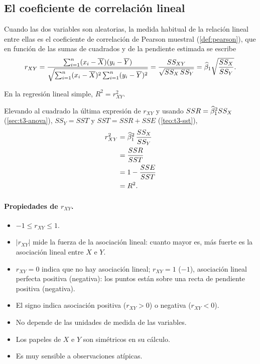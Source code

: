 \subsection{El coeficiente de correlación lineal}

Cuando las dos variables son aleatorias, la medida habitual de la relación lineal entre ellas es
el coeficiente de correlación de Pearson muestral (\cref{def:pearson}), que en función de las
sumas de cuadrados y de la pendiente estimada se escribe
\[
  r_{XY} = \frac{\sum_{i=1}^{n} (x_i-\overline{X})(y_i-\overline{Y})}
                {\sqrt{\sum_{i=1}^{n} (x_i-\overline{X})^2\sum_{i=1}^{n} (y_i-\overline{Y})^2}}
  = \frac{SS_{XY}}{\sqrt{SS_X\,SS_Y}} = \widehat{\beta}_1\sqrt{\frac{SS_X}{SS_Y}} .
\]

\begin{proposicion}
  En la regresión lineal simple, $R^2=r_{XY}^2$.
\end{proposicion}

\begin{demostracion}
  Elevando al cuadrado la última expresión de $r_{XY}$ y usando $SSR=\widehat{\beta}_1^2SS_X$
  (\cref{sec:t3-anova}), $SS_Y=SST$ y $SST=SSR+SSE$ (\cref{teo:t3-sst}),
  \begin{align*}
    r_{XY}^2 &= \widehat{\beta}_1^2\,\frac{SS_X}{SS_Y} \\
    &= \frac{SSR}{SST} \\
    &= 1-\frac{SSE}{SST} \\
    &= R^2 .
  \end{align*}
\end{demostracion}

\paragraph{Propiedades de $r_{XY}$.}
\begin{itemize}
  \item $-1\le r_{XY}\le1$.
  \item $|r_{XY}|$ mide la fuerza de la asociación lineal: cuanto mayor es, más fuerte es la
    asociación lineal entre $X$ e $Y$.
  \item $r_{XY}=0$ indica que no hay asociación lineal; $r_{XY}=1$ ($-1$), asociación lineal
    perfecta positiva (negativa): los puntos están sobre una recta de pendiente positiva
    (negativa).
  \item El signo indica asociación positiva ($r_{XY}>0$) o negativa ($r_{XY}<0$).
  \item No depende de las unidades de medida de las variables.
  \item Los papeles de $X$ e $Y$ son simétricos en su cálculo.
  \item Es muy sensible a observaciones atípicas.
\end{itemize}

